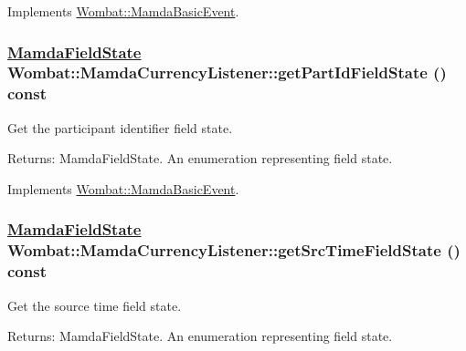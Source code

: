 Implements \hyperlink{classWombat_1_1MamdaBasicEvent_ef95e19f4babb0e5ea8549d6cf29d13f}{Wombat::Mamda\-Basic\-Event}.\hypertarget{classWombat_1_1MamdaCurrencyListener_78906357e4729fb45bf3e80b4d625689}{
\subsubsection[getPartIdFieldState]{\setlength{\rightskip}{0pt plus 5cm}\hyperlink{namespaceWombat_93aac974f2ab713554fd12a1fa3b7d2a}{Mamda\-Field\-State} Wombat::Mamda\-Currency\-Listener::get\-Part\-Id\-Field\-State () const}}
\label{classWombat_1_1MamdaCurrencyListener_78906357e4729fb45bf3e80b4d625689}


Get the participant identifier field state. 

\begin{Desc}
\item[Returns:]Mamda\-Field\-State. An enumeration representing field state. \end{Desc}


Implements \hyperlink{classWombat_1_1MamdaBasicEvent_c361c99af2cf7eb9f5621d89f744fc62}{Wombat::Mamda\-Basic\-Event}.\hypertarget{classWombat_1_1MamdaCurrencyListener_8a309624a9e76fb5e943560e17dd7bf8}{
\subsubsection[getSrcTimeFieldState]{\setlength{\rightskip}{0pt plus 5cm}\hyperlink{namespaceWombat_93aac974f2ab713554fd12a1fa3b7d2a}{Mamda\-Field\-State} Wombat::Mamda\-Currency\-Listener::get\-Src\-Time\-Field\-State () const}}
\label{classWombat_1_1MamdaCurrencyListener_8a309624a9e76fb5e943560e17dd7bf8}


Get the source time field state. 

\begin{Desc}
\item[Returns:]Mamda\-Field\-State. An enumeration representing field state. \end{Desc}


